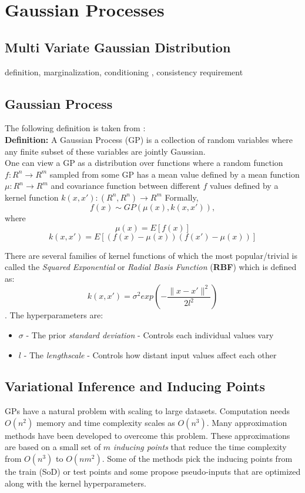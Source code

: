 \section{Gaussian Processes}

\subsection{Multi Variate Gaussian Distribution}

definition, marginalization, conditioning , consistency requirement

\subsection{Gaussian Process}
The following definition is taken from \cite{Rasmussen2006Gaussian2006}: \\
\textbf{Definition:} A Gaussian Process (GP) is a collection of random variables where any finite subset of these variables are jointly Gaussian. \\
One can view a GP as a distribution over functions where a random function $f:R^{n} \rightarrow R^{m}$ sampled from some GP has a mean value defined by a mean function $\mu: R^{n} \rightarrow R^{m}$ and covariance function between different $f$ values defined by a kernel function $k(x,x'): (R^{n}, R^{n}) \rightarrow R^{m} $ 
Formally,
$$f(x) \sim GP(\mu(x), k(x,x')),$$ where $$\mu(x)=E[f(x)]$$ $$k(x,x')=E[(f(x)-\mu(x))(f(x')-\mu(x))]$$ 

There are several families of kernel functions of which the most popular/trivial is called the \textit{Squared Exponential} or \textit{Radial Basis Function} (\textbf{RBF}) which is defined as: \\
$$k(x,x')=\sigma^{2} exp(-\frac{\lVert x-x' \rVert ^{2}}{2l^{2}})$$. The hyperparameters are: \\
\begin{itemize}
    \item $\sigma$ - The prior \textit{standard deviation} - Controls each individual values vary
    \item $l$ - The \textit{lengthscale} - Controls how distant input values affect each other
\end{itemize}

\subsection{Variational Inference and Inducing Points}
GPs have a natural problem with scaling to large datasets. Computation needs $O(n^{2})$ memory and   time complexity scales as $O(n^{3})$. Many approximation methods have been developed to overcome this problem. These approximations are based on a small set of $m$ \textit{inducing points} that reduce the time complexity from $O(n^{3})$ to $O(nm^{2})$. Some of the methods pick the inducing points from the train (SoD) or test points and some propose pseudo-inputs that are optimized along with the kernel hyperparameters. 

